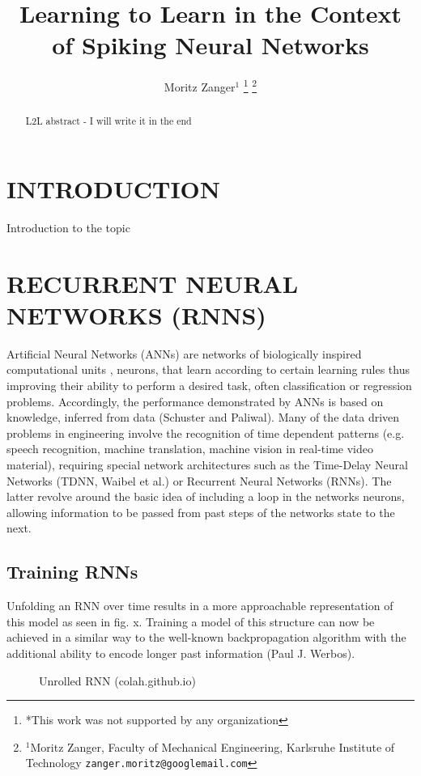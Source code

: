 \documentclass[letterpaper, 10 pt, conference]{ieeeconf}  %
\title{\LARGE \bf
Learning to Learn in the Context of Spiking Neural Networks
}
\author{Moritz Zanger$^{1}$ %
\thanks{*This work was not supported by any organization}%
\thanks{$^{1}$Moritz Zanger, Faculty of Mechanical Engineering, Karlsruhe Institute of Technology
        {\tt\small zanger.moritz@googlemail.com}}%
}
\begin{document}
\maketitle
\thispagestyle{empty}
\pagestyle{empty}


\begin{abstract}

L2L abstract - I will write it in the end

\end{abstract}


\section{INTRODUCTION}

Introduction to the topic

\section{RECURRENT NEURAL NETWORKS (RNNS)}
Artificial Neural Networks (ANNs) are networks of biologically inspired computational units , neurons, that learn 
according to certain learning rules thus improving their ability to perform a desired task, often classification or regression 
problems. Accordingly, the performance demonstrated by ANNs is based on knowledge, inferred from data (Schuster and Paliwal).
Many of the data driven problems in engineering involve the recognition of time dependent patterns (e.g. speech
recognition, machine translation, machine vision in real-time video material), requiring special
network architectures such as the Time-Delay Neural Networks (TDNN, Waibel et al.) or Recurrent Neural Networks (RNNs). 
The latter revolve around the basic idea of including a loop in the networks neurons, allowing information to be passed 
from past steps of the networks state to the next. 

\subsection{Training RNNs}
Unfolding an RNN over time results in a more approachable representation of this model as seen in fig. x. Training a 
model of this structure can now be achieved in a similar way to the well-known backpropagation algorithm with the additional 
ability to encode longer past information (Paul J. Werbos). 
\begin{figure}[thpb]
        \centering
  \caption{Unrolled RNN (colah.github.io)}
        \label{figurelabel}
     \end{figure}
\end{document}
